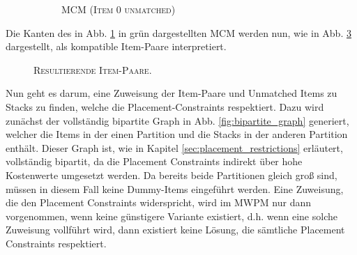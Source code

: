 \begin{figure}[H]
\begin{subfigure}[b]{0.4\textwidth}
    \caption{\textsc{MCM (Item $0$ unmatched)}}
    \label{fig:stacking_const_graph_example_b=2_b}
    \end{subfigure}
    \caption{}
    \label{fig:stacking_const_graph_example_b=2}
\end{figure}

Die Kanten des in Abb. \ref{fig:stacking_const_graph_example_b=2_b} in grün dargestellten \textsc{MCM} werden nun,
wie in Abb. \ref{fig:item_pairs_b=2} dargestellt, als kompatible Item-Paare interpretiert.

\begin{figure}[H]
\centering
{}
  \caption{\textsc{Resultierende Item-Paare.}}
  \label{fig:item_pairs_b=2}
\end{figure}

Nun geht es darum, eine Zuweisung der Item-Paare und Unmatched Items zu Stacks zu finden, welche die Placement-Constraints
respektiert. Dazu wird zunächst der vollständig bipartite Graph in Abb. \ref{fig:bipartite_graph} generiert, welcher
die Items in der einen Partition und die Stacks in der anderen Partition enthält.
Dieser Graph ist, wie in Kapitel \ref{sec:placement_restrictions} erläutert, vollständig bipartit, da die Placement Constraints indirekt
über hohe Kostenwerte umgesetzt werden. Da bereits beide Partitionen gleich groß sind, müssen in diesem
Fall keine Dummy-Items eingeführt werden. Eine Zuweisung, die den Placement Constraints widerspricht, wird im \textsc{MWPM}
nur dann vorgenommen, wenn keine günstigere Variante existiert, d.h. wenn eine solche Zuweisung vollführt wird,
dann existiert keine Lösung, die sämtliche Placement Constraints respektiert.

